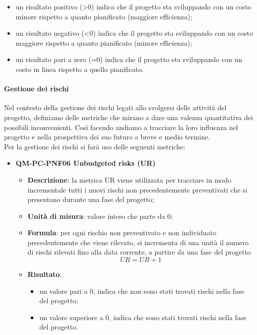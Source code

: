 \begin{itemize}
\begin{itemize}
\begin{itemize}
                                    \item un risultato positivo (>0) indica che il progetto sta sviluppando con un costo minore rispetto a quanto pianificato (maggiore efficienza);
                                    \item un risultato negativo (<0) indica che il progetto sta sviluppando con un costo maggiore rispetto a quanto pianificato (minore efficienza);
                                    \item un risultato pari a zero (=0) indica che il progetto sta sviluppando con un costo in linea rispetto a quello pianificato.
                                \end{itemize}
                        \end{itemize}
                \end{itemize}
            \paragraph{Gestione dei rischi}
                Nel contesto della gestione dei rischi legati allo svolgersi delle attività del progetto, definiamo delle metriche che mirano a dare una valenza quantitativa dei possibili inconvenienti. Così facendo andiamo a tracciare la loro influenza nel progetto e nella prospettiva dei suo futuro a breve e medio termine.\\
                Per la gestione dei rischi si farà uso delle seguenti metriche:
                \begin{itemize}
                    \item\textbf{QM-PC-PNF06 Unbudgeted risks (UR)}
                        \begin{itemize}
                            \item\textbf{Descrizione}: la metrica UR viene utilizzata per tracciare in modo incrementale tutti i nuovi rischi non precedentemente preventivati che si presentano durante una fase del progetto;
                            \item\textbf{Unità di misura}: valore intero che parte da 0;
                            \item\textbf{Formula}: per ogni rischio non preventivato e non individuato precedentemente che viene rilevato, si incrementa di una unità il numero di rischi rilevati fino alla data corrente, a partire da una fase del progetto
                                \[UR = UR + 1 \]
                            \item\textbf{Risultato}:
                                \begin{itemize}
                                    \item un valore pari a 0, indica che non sono stati trovati rischi nella fase del progetto;
                                    \item un valore superiore a 0, indica che sono stati trovati rischi nella fase del progetto.
                                \end{itemize}
                        \end{itemize}
                \end{itemize}
